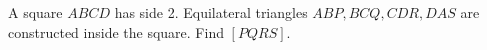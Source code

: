 A square $ABCD$ has side 2. Equilateral triangles $ABP,BCQ,CDR,DAS$ are constructed inside the square. Find $[PQRS]$.

